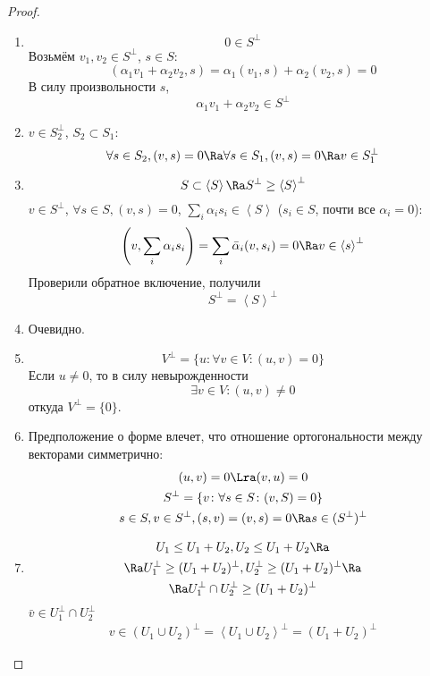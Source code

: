 \begin{proof}
	\begin{enumerate}
	\item
		\[ 0 \in S^\bot \]
		Возьмём $v_1, v_2 \in S^\bot$, $s \in S$:
		\[ (\alpha_1 v_1 + \alpha_2 v_2, s) = \alpha_1(v_1, s) + \alpha_2(v_2, s) = 0 \]
		В силу произвольности $s$,
		\[ \alpha_1 v_1 + \alpha_2 v_2 \in S^\bot \]

	\item
		$v \in S_2^\bot$, $S_2 \subset S_1$:
		\[
			\forall s \in S_2, (v, s) = 0
			\Ra \forall s \in S_1, (v, s) = 0
			\Ra v  \in S_1^\bot
		\]

	\item
		\[
			S \subset \left<S\right> \Ra S^\bot \ge \left<S\right>^\bot
		\]
		$v \in S^\bot$, $\forall s \in S, (v, s) = 0$,
		$\sum_i \alpha_i s_i \in \left<S\right>$ ($s_i \in S$, почти все $\alpha_i = 0$):
		\[
			\left(v, \sum_i \alpha_i s_i\right) = \sum_i \bar \alpha_i (v, s_i) = 0
			\Ra v \in \left<s\right>^\bot
		\]
		Проверили обратное включение, получили
		\[ S^\bot = \left<S\right>^\bot \]

	\item
		Очевидно.

	\item
		\[ V^\bot = \{u \colon \forall v \in V \colon (u, v) = 0\} \]
		Если $u \ne 0$, то в силу невырожденности
		\[ \exists v \in V \colon (u, v) \ne 0 \]
		откуда $V^\bot = \{0\}$.

	\item
		Предположение о форме влечет, что отношение ортогональности между векторами симметрично:
		\begin{gather*}
			(u, v) = 0 \Lra (v, u) = 0 \\
			S^\bot = \{v\colon \forall s \in S \colon (v, S) = 0\} \\
			s \in S, v \in S^\bot, (s, v) = (v, s) = 0 \Ra s \in (S^\bot)^\bot
		\end{gather*}

	\item
		\begin{gather*}
			U_1 \le U_1 + U_2, U_2 \le U_1 + U_2 \Ra \\
			\Ra U_1^\bot \ge (U_1 + U_2)^\bot, U_2^\bot \ge (U_1 + U_2)^\bot \Ra \\
			\Ra U_1^\bot \cap U_2^\bot \ge (U_1 + U_2)^\bot
		\end{gather*}
		$\bar v \in  U_1^\bot \cap U_2^\bot$
		\begin{gather*}
			v \in (U_1 \cup U_2)^\bot = \left<U_1 \cup U_2\right>^\bot = (U_1 + U_2)^\bot
		\end{gather*}


\end{enumerate}
\end{proof}
